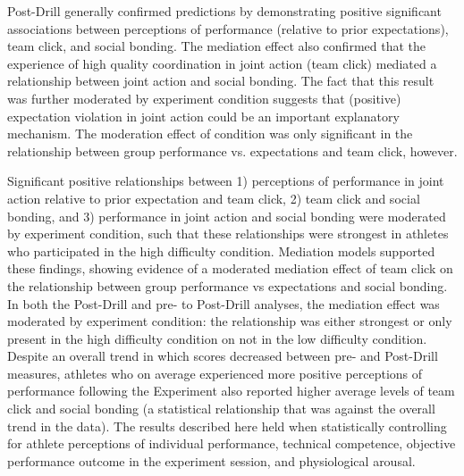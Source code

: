{

Post-Drill generally confirmed predictions by demonstrating positive significant associations between perceptions of performance (relative to prior expectations), team click, and social bonding.  The mediation effect also confirmed that the experience of high quality coordination in joint action (team click) mediated a relationship between joint action and social bonding.  The fact that this result was further moderated by experiment condition suggests that (positive) expectation violation in joint action could be an important explanatory mechanism.  The moderation effect of condition was only significant in the relationship between group performance vs. expectations and team click, however.

Significant positive relationships between 1) perceptions of performance in joint action relative to prior expectation and team click, 2) team click and social bonding,  and 3) performance in joint action and social bonding were moderated by experiment condition, such that these relationships were strongest in athletes who participated in the high difficulty condition.  Mediation models supported these findings, showing evidence of a moderated mediation effect of team click on the relationship between group performance vs expectations and social bonding.  In both the Post-Drill and pre- to Post-Drill analyses, the mediation effect was moderated by experiment condition: the relationship was either strongest or only present in the high difficulty condition on not in the low difficulty condition.  Despite an overall trend in which scores decreased between pre- and Post-Drill measures, athletes who on average experienced more positive perceptions of performance following the Experiment also reported higher average levels of team click and social bonding (a statistical relationship that was against the overall trend in the data).  The results described here held when statistically controlling for athlete perceptions of individual performance, technical competence, objective performance outcome in the experiment session, and physiological arousal.

}
